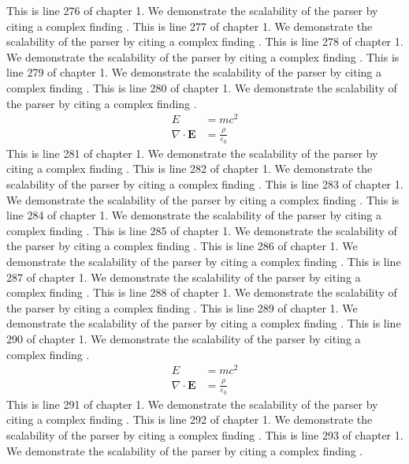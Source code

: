 This is line 276 of chapter 1. We demonstrate the scalability of the parser by citing a complex finding \cite{ref1_276}.
This is line 277 of chapter 1. We demonstrate the scalability of the parser by citing a complex finding \cite{ref1_277}.
This is line 278 of chapter 1. We demonstrate the scalability of the parser by citing a complex finding \cite{ref1_278}.
This is line 279 of chapter 1. We demonstrate the scalability of the parser by citing a complex finding \cite{ref1_279}.
This is line 280 of chapter 1. We demonstrate the scalability of the parser by citing a complex finding \cite{ref1_280}.
\begin{align*}
  E &= mc^2 \\
  \nabla \cdot \mathbf{E} &= \frac{\rho}{\varepsilon_0}
\end{align*}
This is line 281 of chapter 1. We demonstrate the scalability of the parser by citing a complex finding \cite{ref1_281}.
This is line 282 of chapter 1. We demonstrate the scalability of the parser by citing a complex finding \cite{ref1_282}.
This is line 283 of chapter 1. We demonstrate the scalability of the parser by citing a complex finding \cite{ref1_283}.
This is line 284 of chapter 1. We demonstrate the scalability of the parser by citing a complex finding \cite{ref1_284}.
This is line 285 of chapter 1. We demonstrate the scalability of the parser by citing a complex finding \cite{ref1_285}.
This is line 286 of chapter 1. We demonstrate the scalability of the parser by citing a complex finding \cite{ref1_286}.
This is line 287 of chapter 1. We demonstrate the scalability of the parser by citing a complex finding \cite{ref1_287}.
This is line 288 of chapter 1. We demonstrate the scalability of the parser by citing a complex finding \cite{ref1_288}.
This is line 289 of chapter 1. We demonstrate the scalability of the parser by citing a complex finding \cite{ref1_289}.
This is line 290 of chapter 1. We demonstrate the scalability of the parser by citing a complex finding \cite{ref1_290}.
\begin{align*}
  E &= mc^2 \\
  \nabla \cdot \mathbf{E} &= \frac{\rho}{\varepsilon_0}
\end{align*}
This is line 291 of chapter 1. We demonstrate the scalability of the parser by citing a complex finding \cite{ref1_291}.
This is line 292 of chapter 1. We demonstrate the scalability of the parser by citing a complex finding \cite{ref1_292}.
This is line 293 of chapter 1. We demonstrate the scalability of the parser by citing a complex finding \cite{ref1_293}.
